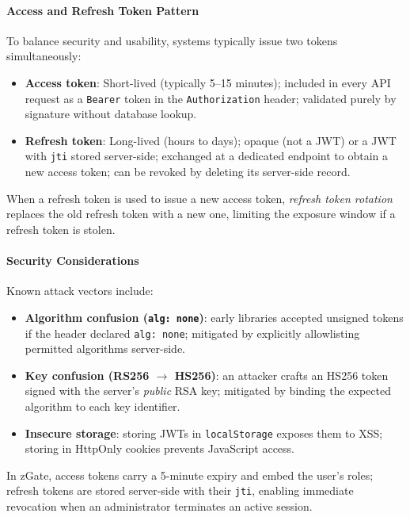 \paragraph{Access and Refresh Token Pattern}

To balance security and usability, systems typically issue two tokens simultaneously:

\begin{itemize}
    \item \textbf{Access token}: Short-lived (typically 5--15 minutes); included in every API request as a \texttt{Bearer} token in the \texttt{Authorization} header; validated purely by signature without database lookup.
    \item \textbf{Refresh token}: Long-lived (hours to days); opaque (not a JWT) or a JWT with \texttt{jti} stored server-side; exchanged at a dedicated endpoint to obtain a new access token; can be revoked by deleting its server-side record.
\end{itemize}

When a refresh token is used to issue a new access token, \emph{refresh token rotation} replaces the old refresh token with a new one, limiting the exposure window if a refresh token is stolen.

\paragraph{Security Considerations}

Known attack vectors include:
\begin{itemize}
    \item \textbf{Algorithm confusion (\texttt{alg: none})}: early libraries accepted unsigned tokens if the header declared \texttt{alg: none}; mitigated by explicitly allowlisting permitted algorithms server-side.
    \item \textbf{Key confusion (RS256 $\to$ HS256)}: an attacker crafts an HS256 token signed with the server's \emph{public} RSA key; mitigated by binding the expected algorithm to each key identifier.
    \item \textbf{Insecure storage}: storing JWTs in \texttt{localStorage} exposes them to XSS; storing in HttpOnly cookies prevents JavaScript access.
\end{itemize}

In zGate, access tokens carry a 5-minute expiry and embed the user's roles; refresh tokens are stored server-side with their \texttt{jti}, enabling immediate revocation when an administrator terminates an active session.

